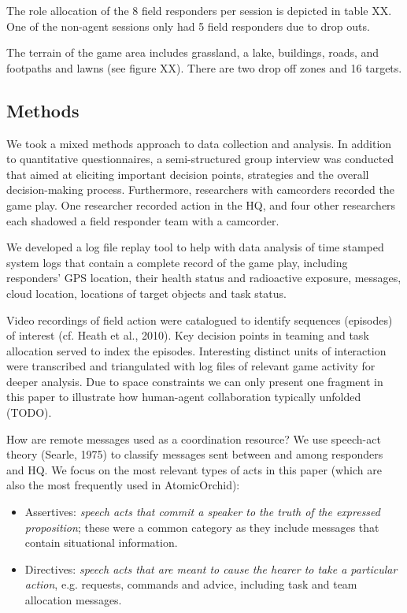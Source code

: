 The role allocation of the 8 field responders per session is depicted in table XX. One of the non-agent sessions only had 5 field responders due to drop outs. 

The terrain of the game area includes grassland, a lake, buildings, roads, and footpaths and lawns (see figure XX). There are two drop off zones and 16 targets.

\subsection{Methods}
We took a mixed methods approach to data collection and analysis. In addition to quantitative questionnaires, a semi-structured group interview was conducted that aimed at eliciting important decision points, strategies and the overall decision-making process. Furthermore, researchers with camcorders recorded the game play. One researcher recorded action in the HQ, and four other researchers each shadowed a field responder team with a camcorder.

We developed a log file replay tool to help with data analysis of time stamped system logs that contain a complete record of the game play, including responders' GPS location, their health status and radioactive exposure, messages, cloud location, locations of target objects and task status.

Video recordings of field action were catalogued to identify sequences (episodes) of interest (cf. Heath et al., 2010). Key decision points in teaming and task allocation served to index the episodes. Interesting distinct units of interaction were transcribed and triangulated with log files of relevant game activity for deeper analysis. Due to space constraints we can only  present one fragment in this paper to illustrate how human-agent collaboration typically unfolded (TODO).

How are remote messages used as a coordination resource? We use speech-act theory (Searle, 1975) to classify messages sent between and among responders and HQ. We focus on the most relevant types of acts in this paper (which are also the most frequently used in AtomicOrchid):

\begin{itemize}
\item Assertives: \textit{speech acts that commit a speaker to the truth of the expressed proposition}; these were a common category as they include messages that contain situational information.
\item Directives: \textit{speech acts that are meant to cause the hearer to take a particular action}, e.g. requests, commands and advice, including task and team allocation messages. 
\end{itemize}


